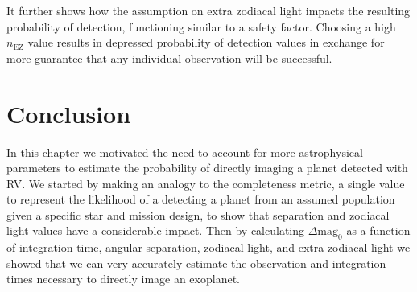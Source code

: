 It further shows how the assumption on extra zodiacal light impacts the
resulting probability of detection, functioning similar to a safety factor. Choosing
a high $n_\textrm{EZ}$ value results in depressed probability of detection values
in exchange for more guarantee that any individual observation will be successful.


\section{Conclusion} %
\label{sec:con_ddMag_comp}

In this chapter we motivated the need to account for more astrophysical
parameters to estimate the probability of directly imaging a planet detected
with RV. We started by making an analogy to the completeness metric, a single
value to represent the likelihood of a detecting a planet from an assumed
population given a specific star and mission design, to show that separation
and zodiacal light values have a considerable impact. Then by calculating 
$\Delta\textrm{mag}_0$ as a function of integration time, angular separation,
zodiacal light, and extra zodiacal light we showed that we can very
accurately estimate the observation and integration times necessary to
directly image an exoplanet.

